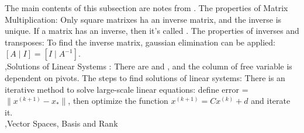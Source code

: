 \documentclass[12pt]{report}
\begin{document}
The main contents of this subsection are notes from \cite{deisenroth2020mathematics}.
The properties of Matrix Multiplication:
Only square matrixes ha an inverse matrix, and the inverse is unique. If a matrix has an inverse, then it's called .
The properties of inverses and transposes:
To find the inverse matrix, gaussian elimination can be applied: $[A\mid I]=[I\mid A^{-1}]$.\\
\sep{Solutions of Linear Systems}
:
There are  and , and the column of free variable is dependent on pivots. The steps to find solutions of linear systems:
There is an iterative method to solve large-scale linear equations:
define error = $\|x^{(k+1)}-x_*\|$, then optimize the function $x^{(k+1)}=Cx^{(k)}+d$ and iterate it.\\
\sep{Vector Spaces, Basis and Rank}
\end{document}
